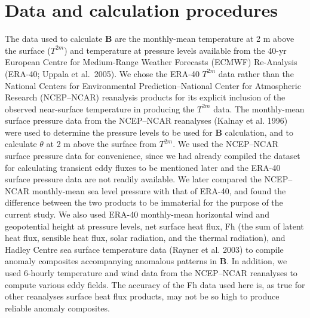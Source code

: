 \documentclass{ametsocv6.1}
\begin{document}
\section{Data and calculation procedures}
The data used to calculate $\mathbf{B}$ are the monthly-mean
temperature at 2 m above the surface ($T^{2m}$) and temperature
at pressure levels available from the 40-yr European
Centre for Medium-Range Weather Forecasts (ECMWF)
Re-Analysis (ERA-40; Uppala et al.~2005). We chose
the ERA-40 $T^{2m}$ data rather than the National Centers
for Environmental Prediction--National Center for Atmospheric
Research (NCEP--NCAR) reanalysis products
for its explicit inclusion of the observed near-surface temperature
in producing the $T^{2m}$ data. The monthly-mean
surface pressure data from the NCEP--NCAR reanalyses
(Kalnay et al. 1996) were used to determine the pressure
levels to be used for $\mathbf B$ calculation, and to calculate $\theta$ 
at 2 m
above the surface from $T^{2m}$. We used the NCEP--NCAR
surface pressure data for convenience, since we had already
compiled the dataset for calculating transient eddy
fluxes to be mentioned later and the ERA-40 surface
pressure data are not readily available. We later compared
the NCEP--NCAR monthly-mean sea level pressure with
that of ERA-40, and found the difference between the two
products to be immaterial for the purpose of the current
study. We also used ERA-40 monthly-mean horizontal
wind and geopotential height at pressure levels, net surface
heat flux, Fh (the sum of latent heat flux, sensible heat flux,
solar radiation, and the thermal radiation), and Hadley
Centre sea surface temperature data (Rayner et al. 2003)
to compile anomaly composites accompanying anomalous
patterns in $\mathbf B$. In addition, we used 6-hourly temperature
and wind data from the NCEP--NCAR reanalyses to
compute various eddy fields. The accuracy of the Fh data
used here is, as true for other reanalyses surface heat flux
products, may not be so high to produce reliable anomaly
composites.
\end{document}
